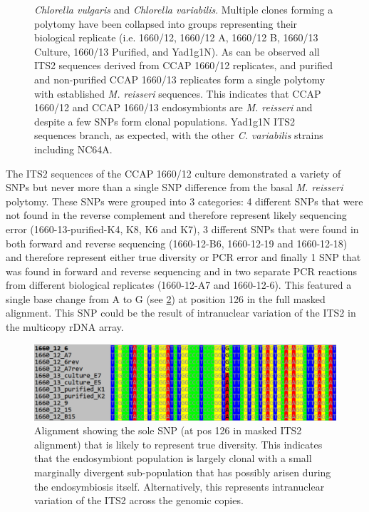 \begin{figure}
{    \textit{Chlorella vulgaris} and \textit{Chlorella variabilis}.  Multiple clones
    forming a polytomy have been collapsed into groups representing their biological
    replicate (i.e. 1660/12, 1660/12 A, 1660/12 B, 1660/13 Culture, 1660/13 Purified,
    and Yad1g1N). As can be observed all
    ITS2 sequences derived from CCAP 1660/12 replicates, and purified and non-purified CCAP 1660/13
    replicates form a single polytomy with established \textit{M. reisseri} sequences.  This indicates 
    that CCAP 1660/12 and CCAP 1660/13 endosymbionts are \textit{M. reisseri} and despite a few SNPs
form clonal populations.  Yad1g1N ITS2 sequences branch, as expected, with the other \textit{C. variabilis}
strains including NC64A.}
    \label{fig:its2_phylo}
\end{figure}

The ITS2 sequences of the CCAP 1660/12 culture demonstrated a 
variety of SNPs but never more than a single SNP difference from the basal \textit{M. reisseri}
polytomy.  These SNPs were grouped into 3 categories: 4 different SNPs that were not found in the
reverse complement and therefore represent likely sequencing error (1660-13-purified-K4, K8, K6 and K7),
3 different SNPs that were found in both forward and reverse sequencing (1660-12-B6, 1660-12-19 and 1660-12-18) and therefore
represent either true diversity or PCR error and finally 1 SNP that was found in 
forward and reverse sequencing and in two separate PCR reactions from different biological replicates (1660-12-A7 and 1660-12-6).
This featured a single base change from A to G (see \cref{fig:its2_snp}) at position 126 in the full masked alignment. 
This SNP could be the result of intranuclear variation of the ITS2 in the multicopy rDNA array.

\begin{figure}
    \includegraphics[width=\textwidth]{its_snp.pdf}
    \caption[ITS2 SNP alignment]{Alignment showing the sole SNP (at pos 126 in masked ITS2 alignment)
        that is likely to represent true diversity.  This indicates that the endosymbiont
    population is largely clonal with a small marginally divergent sub-population that has possibly
arisen during the endosymbiosis itself. Alternatively, this represents intranuclear variation of
the ITS2 across the genomic copies.}
    \label{fig:its2_snp}
\end{figure}

